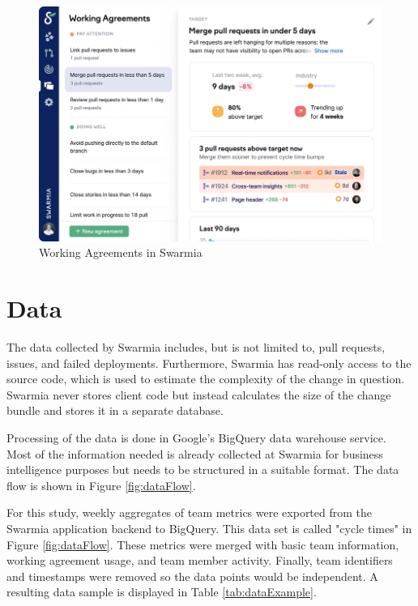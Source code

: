 \begin{figure}[ht]
    \begin{center}
        \includegraphics[width=13.5cm]{LaTeX/images/improvement.png}
        \caption{Working Agreements in Swarmia}
        \label{fig:WorkingAgreements}
    \end{center}
\end{figure}

\section{Data}

The data collected by Swarmia includes, but is not limited to, pull requests, issues, and failed deployments. Furthermore, Swarmia has read-only access to the source code, which is used to estimate the complexity of the change in question. Swarmia never stores client code but instead calculates the size of the change bundle and stores it in a separate database. 

Processing of the data is done in Google's BigQuery data warehouse service. Most of the information needed is already collected at Swarmia for business intelligence purposes but needs to be structured in a suitable format. The data flow is shown in Figure \ref{fig:dataFlow}.





For this study, weekly aggregates of team metrics were exported from the Swarmia application backend to BigQuery. This data set is called "cycle times" in Figure \ref{fig:dataFlow}. These metrics were merged with basic team information, working agreement usage, and team member activity. Finally, team identifiers and timestamps were removed so the data points would be independent. A resulting data sample is displayed in Table \ref{tab:dataExample}.

